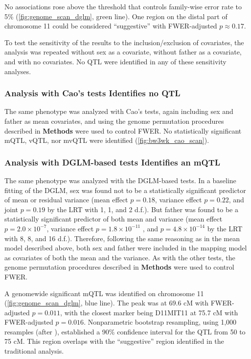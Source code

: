 No associations rose above the threshold that controls family-wise error rate to 5\% (\autoref{fig:genome_scan_dglm}, green line).
One region on the distal part of chromosome 11 could be considered ``suggestive'' with FWER-adjusted $p \approx 0.17$.

To test the sensitivity of the results to the inclusion/exclusion of covariates, the analysis was repeated without sex as a covariate, without father as a covariate, and with no covariates.
No QTL were identified in any of these sensitivity analyses.

\subsubsection{Analysis with Cao's tests Identifies no QTL}
The same phenotype was analyzed with Cao's tests, again including sex and father as mean covariates, and using the genome permutation procedures described in \textbf{Methods} were used to control FWER.
No statistically significant mQTL, vQTL, nor mvQTL were identified (\autoref{fig:bw3wk_cao_scan}).

\subsubsection{Analysis with DGLM-based tests Identifies an mQTL}
The same phenotype was analyzed with the DGLM-based tests.
In a baseline fitting of the DGLM, sex was found not to be a statistically significant predictor of mean or residual variance (mean effect $p = 0.18$, variance effect $p = 0.22$, and joint $p = 0.19$ by the LRT with 1, 1, and 2 d.f.).
But father was found to be a statistically significant predictor of both mean and variance (mean effect $p = 2.0 \times 10^{-7}$, variance effect $p = 1.8 \times 10^{-11}$ , and $p = 4.8 \times 10^{-14}$ by the LRT with 8, 8, and 16 d.f.).
Therefore, following the same reasoning as in the mean model described above, both sex and father were included in the mapping model as covariates of both the mean and the variance.
As with the other tests, the genome permutation procedures described in \textbf{Methods} were used to control FWER.

A genomewide significant mQTL was identified on chromosome 11 (\autoref{fig:genome_scan_dglm}, blue line).
The peak was at 69.6 cM with FWER-adjusted $p=0.011$, with the closest marker being D11MIT11 at 75.7 cM with FWER-adjusted $p=0.016$.
Nonparametric bootstrap resampling, using 1,000 resamples (after \citealt{Visscher1996}), established a 90\% confidence interval for the QTL from 50 to 75 cM.
This region overlaps with the ``suggestive'' region identified in the traditional analysis.


